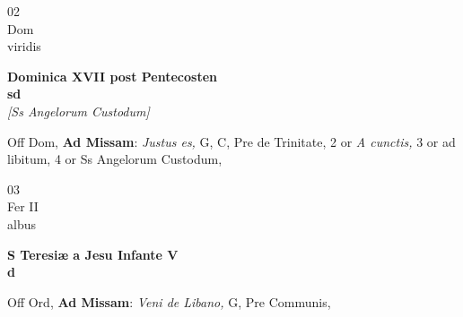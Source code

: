 \documentclass[10pt, openany]{book}
\begin{document}
        \begin{center}
            \begin{minipage}{3.5in}
                \vspace{2em}
                \begin{minipage}{0.5in}
                    {\Huge 02} \\
                    {\normalsize Dom} \\
                    {\normalsize viridis}
                \end{minipage}
                \begin{minipage}{3.0in}
                    \textbf{ \large Dominica XVII post Pentecosten \\
                    \textnormal{\normalsize sd}} \\ \textit{[Ss Angelorum Custodum]} \\ 
                \end{minipage}
                \begin{justify}Off Dom, \textbf{Ad Missam}: \textit{Justus es,} G, C, Pre de Trinitate, 2 or \textit{A cunctis,} 3 or ad libitum, 4 or Ss Angelorum Custodum,   
                \end{justify}
            \end{minipage}
        \end{center}
    
        \begin{center}
            \begin{minipage}{3.5in}
                \vspace{2em}
                \begin{minipage}{0.5in}
                    {\Huge 03} \\
                    {\normalsize Fer II} \\
                    {\normalsize albus}
                \end{minipage}
                \begin{minipage}{3.0in}
                    \textbf{ \large S Teresiæ a Jesu Infante V \\
                    \textnormal{\normalsize d}} \\ 
                \end{minipage}
                \begin{justify}Off Ord, \textbf{Ad Missam}: \textit{Veni de Libano,} G, Pre Communis,   
                \end{justify}
            \end{minipage}
        \end{center}
    
\end{document}
